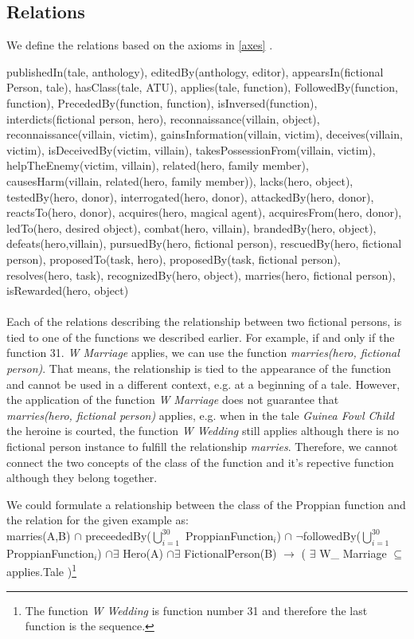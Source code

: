 \documentclass[10pt,a4paper]{article}
\begin{document}
\subsection{Relations}
We define the relations based on the axioms in \ref{axes} . 

publishedIn(tale, anthology), editedBy(anthology, editor), appearsIn(fictional Person, tale), hasClass(tale, ATU), applies(tale, function), FollowedBy(function, function), PrecededBy(function, function), isInversed(function), interdicts(fictional person, hero), reconnaissance(villain, object), reconnaissance(villain, victim), gainsInformation(villain, victim), deceives(villain, victim), isDeceivedBy(victim, villain), takesPossessionFrom(villain, victim), helpTheEnemy(victim, villain), related(hero, family member), causesHarm(villain, related(hero, family member)), lacks(hero, object), testedBy(hero, donor), interrogated(hero, donor), attackedBy(hero, donor), reactsTo(hero, donor), acquires(hero, magical agent), acquiresFrom(hero, donor), ledTo(hero, desired object), combat(hero, villain), brandedBy(hero, object), defeats(hero,villain), pursuedBy(hero, fictional person), rescuedBy(hero, fictional person), proposedTo(task, hero), proposedBy(task, fictional person), resolves(hero, task), recognizedBy(hero, object), marries(hero, fictional person), isRewarded(hero, object)
\\ \\
Each of the relations describing the relationship between two fictional persons, is tied to one of the functions we described earlier. For example, if and only if the function 31. \textit{W Marriage} applies, we can use the function \textit{marries(hero, fictional person)}. That means, the relationship is tied to the appearance of the function and cannot be used in a different context, e.g. at a beginning of a tale. 
However, the application of the function \textit{W Marriage} does not guarantee that \textit{marries(hero, fictional person)} applies, e.g. when in the tale \textit{Guinea Fowl Child} the heroine is courted, the function \textit{W Wedding} still applies although there is no fictional person instance to fulfill the relationship \textit{marries}. Therefore, we cannot connect the two concepts of the class of the function and it's repective function although they belong together.   


We could formulate a relationship between the class of the Proppian function and the relation for the given example as: \\
\label{Rel}
\small
marries(A,B) $\cap$ preceededBy($\bigcup\limits_{i=1}^{30}$ ProppianFunction$_{i}$)  $\cap$ $\neg$followedBy($\bigcup\limits_{i=1}^{30}$ ProppianFunction$_{i}$)
$\cap \exists $ Hero(A) $\cap \exists$ FictionalPerson(B) $\rightarrow$ ( $\exists$ W\_ Marriage $\subseteq$ applies.Tale )\footnote{The function \textit{W Wedding} is function number 31 and therefore the last function is the sequence.} \\
\end{document}
